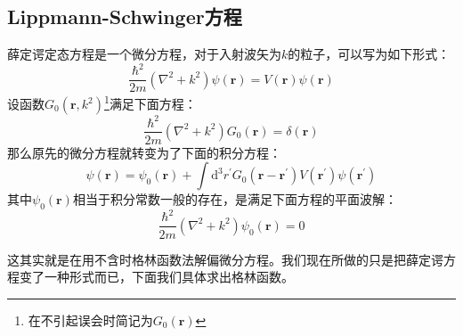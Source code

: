 \documentclass[a4paper,zihao=-4,linespread=1]{ctexrep}
\begin{document}
	\subsection{Lippmann-Schwinger方程}
	薛定谔定态方程是一个微分方程，对于入射波矢为$k$的粒子，可以写为如下形式：
	\[\frac{\hbar^2}{2m}\left(\nabla^2+k^2\right)\psi(\mathbf{r})=V(\mathbf{r})\psi(\mathbf{r})\]
	设函数$G_0(\mathbf{r},k^2)$\footnote{在不引起误会时简记为$G_0(\mathbf{r})$}满足下面方程：
	\begin{equation}
		\label{eq:11.16}
		\frac{\hbar^2}{2m}\left(\nabla^2+k^2\right)G_0(\mathbf{r})=\delta(\mathbf{r})
	\end{equation}
	那么原先的微分方程就转变为了下面的积分方程：
	\begin{equation}
		\label{eq:11.17}
		\psi(\mathbf{r})=\psi_0(\mathbf{r})+\int \mathrm{d}^3r^\prime G_0(\mathbf{r}-\mathbf{r}^\prime) V(\mathbf{r}^\prime)\psi(\mathbf{r}^\prime)
	\end{equation}
	其中$\psi_0(\mathbf{r})$相当于积分常数一般的存在，是满足下面方程的平面波解：
	\[\frac{\hbar^2}{2m}\left(\nabla^2+k^2\right)\psi_0(\mathbf{r})=0\]
	
	这其实就是在用不含时格林函数法解偏微分方程。我们现在所做的只是把薛定谔方程变了一种形式而已，下面我们具体求出格林函数。
	
\end{document}
